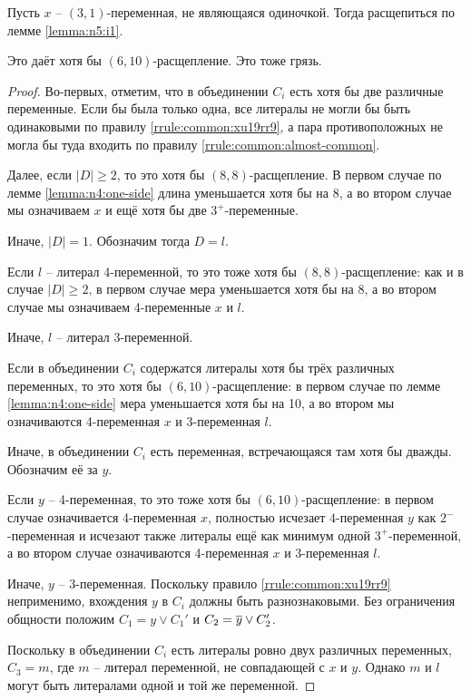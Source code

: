 \begin{brule}
 Пусть $x$ -- $(3,1)$-переменная, не являющаяся одиночкой. 
 Тогда расщепиться по лемме \ref{lemma:n5:i1}.

 Это даёт хотя бы $(6,10)$-расщепление.
 {\color{white} Это тоже грязь.}
 \label{brule:n4:31:ns}
\end{brule}

\begin{proof}
 Во-первых, отметим, что в объединении $C_i$ есть хотя бы две различные переменные.
 Если бы была только одна, все литералы не могли бы быть одинаковыми по правилу \ref{rrule:common:xu19rr9}, а пара противоположных не могла бы туда входить по правилу \ref{rrule:common:almost-common}.

 Далее, если $|D| \geq 2$, то это хотя бы $(8,8)$-расщепление. В первом случае по лемме \ref{lemma:n4:one-side} длина уменьшается хотя бы на 8, а во втором случае мы означиваем $x$ и ещё хотя бы две $3^+$-переменные.

 Иначе, $|D| = 1$. Обозначим тогда $D = l$.

 Если $l$ -- литерал 4-переменной, то это тоже хотя бы $(8,8)$-расщепление: как и в случае $|D| \geq 2$, в первом случае мера уменьшается хотя бы на 8, а во втором случае мы означиваем 4-переменные $x$ и $l$.

 Иначе, $l$ -- литерал 3-переменной.

 Если в объединении $C_i$ содержатся литералы хотя бы трёх различных переменных, то это хотя бы $(6,10)$-расщепление: в первом случае по лемме \ref{lemma:n4:one-side} мера уменьшается хотя бы на 10, а во втором мы означиваются 4-переменная $x$ и 3-переменная $l$.

 Иначе, в объединении $C_i$ есть переменная, встречающаяся там хотя бы дважды.
 Обозначим её за $y$.

 Если $y$ -- 4-переменная, то это тоже хотя бы $(6,10)$-расщепление: в первом случае означивается 4-переменная $x$, полностью исчезает $4$-переменная $y$ как $2^-$-переменная и исчезают также литералы ещё как минимум одной $3^+$-переменной, а во втором случае означиваются 4-переменная $x$ и 3-переменная $l$.

 Иначе, $y$ -- 3-переменная. Поскольку правило \ref{rrule:common:xu19rr9} неприменимо, вхождения $y$ в $C_i$ должны быть разнознаковыми. Без ограничения общности положим $C_1 = y \vee C_1'$ и $C_2 = \overline{y} \vee C_2'$.

 Поскольку в объединении $C_i$ есть литералы ровно двух различных переменных, $C_3 = m$, где $m$ -- литерал переменной, не совпадающей с $x$ и $y$. Однако $m$ и $l$ могут быть литералами одной и той же переменной.


\end{proof}
